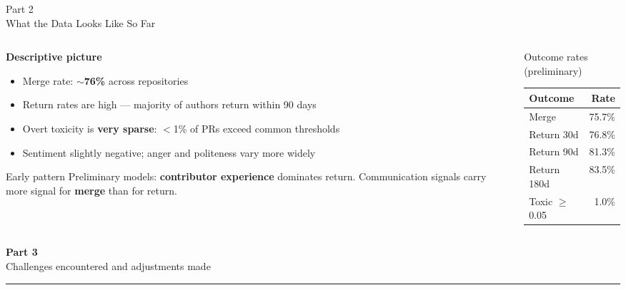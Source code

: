 \documentclass[aspectratio=169,11pt]{beamer}
\begin{document}
\begin{frame}{Part 2\\What the Data Looks Like So Far}

\begin{columns}[T]
\begin{column}{0.52\textwidth}
\textbf{Descriptive picture}
\begin{itemize}
  \item Merge rate: $\sim$\textbf{76\%} across repositories
  \item Return rates are high — majority of authors return within 90 days
  \item Overt toxicity is \textbf{very sparse}: $<$1\% of PRs exceed common thresholds
  \item Sentiment slightly negative; anger and politeness vary more widely
\end{itemize}

\begin{alertblock}{Early pattern}
Preliminary models: \textbf{contributor experience} dominates return.
Communication signals carry more signal for \textbf{merge} than for return.
\end{alertblock}
\end{column}

\begin{column}{0.44\textwidth}
\begin{block}{Outcome rates (preliminary)}
\begin{center}
\small
\begin{tabular}{lr}
\toprule
\textbf{Outcome} & \textbf{Rate} \\
\midrule
Merge         & 75.7\% \\
Return 30d    & 76.8\% \\
Return 90d    & 81.3\% \\
Return 180d   & 83.5\% \\
\midrule
Toxic $\geq$0.05 & 1.0\% \\
\bottomrule
\end{tabular}
\end{center}
\end{block}
\end{column}
\end{columns}

\end{frame}

\begin{frame}
\vfill
\begin{center}
  {\Large\bfseries\color{accentblue} Part 3}\\[0.5em]
  {\large Challenges encountered and adjustments made}\\[0.3em]
  {\color{darkblue}\rule{0.55\textwidth}{0.6pt}}
\end{center}
\vfill
\end{frame}
\end{document}
